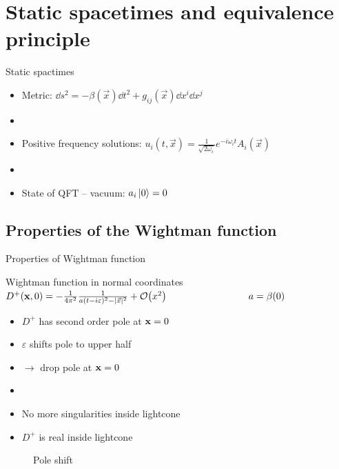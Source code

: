 \documentclass{beamer}
\renewcommand{\va}[1]{\vec{#1}}
\begin{document}
\frame{\setcounter{tocdepth}{1}\hspace{1cm}\tableofcontents}

\section{Static spacetimes and equivalence principle}
\begin{frame}{Static spactimes}
\begin{itemize}
	\item Metric: \(\dd{s^2} = -\beta(\va{x}) \dd{t^2} + g_{ij}(\va{x}) \dd{x^i} \dd{x^j}\)
	\item[]
	\item Positive frequency solutions: \(u_{i}(t, \va{x}) = \frac{1}{\sqrt{2\omega_i}}e^{-i\omega_i t} A_i(\va{x})\)
	\item[]
	\item State of QFT -- vacuum: \(a_i \ket*{0} = 0\)
\end{itemize}
\end{frame}

\subsection{Properties of the Wightman function}
\begin{frame}{Properties of Wightman function}
\begin{block}{Wightman function in normal coordinates}
\(D^+(\vb{x},0) = -\frac{1}{4\pi^2} \frac{1}{a(t-i\varepsilon)^2 - |\va{x}|^2} + \order{x^2}\hspace{3cm} a = \beta(0)\)
\end{block}
\begin{itemize}
	\item \(D^+\) has second order pole at \(\vb{x} = 0\)
	\item \(\varepsilon\) shifts pole to upper half
	\item[] \(\to\) drop pole at \(\vb{x} = 0\)
	\item[]
	\item No more singularities inside lightcone
	\item \(D^+\) is real inside lightcone
\end{itemize}
\begin{figure}
\centering
{}
\caption{Pole shift}
\end{figure}
\end{frame}
\end{document}
